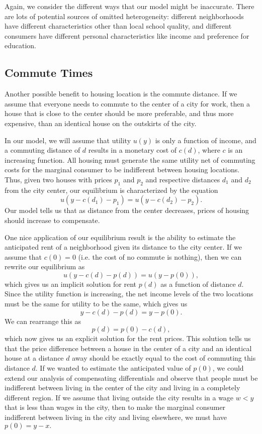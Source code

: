 Again, we consider the different ways that our model might be inaccurate. There are lots of potential sources of omitted heterogeneity: different neighborhoods have different characteristics other than local school quality, and different consumers have different personal characteristics like income and preference for education. 

\subsection*{Commute Times} 
Another possible benefit to housing location is the commute distance. If we assume that everyone needs to commute to the center of a city for work, then a house that is close to the center should be more preferable, and thus more expensive, than an identical house on the outskirts of the city.

In our model, we will assume that utility $u(y)$ is only a function of income, and a commuting distance of $d$ results in a monetary cost of $c(d)$, where $c$ is an increasing function. All housing must generate the same utility net of commuting costs for the marginal consumer to be indifferent between housing locations. Thus, given two houses with prices $p_1$ and $p_2$ and respective distances $d_1$ and $d_2$ from the city center, our equilibrium is characterized by the equation
$$u(y - c(d_1) - p_1) = u(y - c(d_2) - p_2).$$
Our model tells us that as distance from the center decreases, prices of housing should increase to compensate.

One nice application of our equilibrium result is the ability to estimate the anticipated rent of a neighborhood given its distance to the city center. If we assume that $c(0) = 0$ (i.e. the cost of no commute is nothing), then we can rewrite our equilibrium as 
$$u(y-c(d)-p(d)) = u(y-p(0)),$$
which gives us an implicit solution for rent $p(d)$ as a function of distance $d$. Since the utility function is increasing, the net income levels of the two locations must be the same for utility to be the same, which gives us
$$y-c(d) - p(d) = y - p(0).$$
We can rearrange this as
$$p(d) = p(0) - c(d),$$
which now gives us an explicit solution for the rent prices. This solution tells us that the price difference between a house in the center of a city and an identical house at a distance $d$ away should be exactly equal to the cost of commuting this distance $d$. If we wanted to estimate the anticipated value of $p(0)$, we could extend our analysis of compensating differentials and observe that people must be indifferent between living in the center of the city and living in a completely different region. If we assume that living outside the city results in a wage $w < y$ that is less than wages in the city, then to make the marginal consumer indifferent between living in the city and living elsewhere, we must have $p(0) = y - x.$


